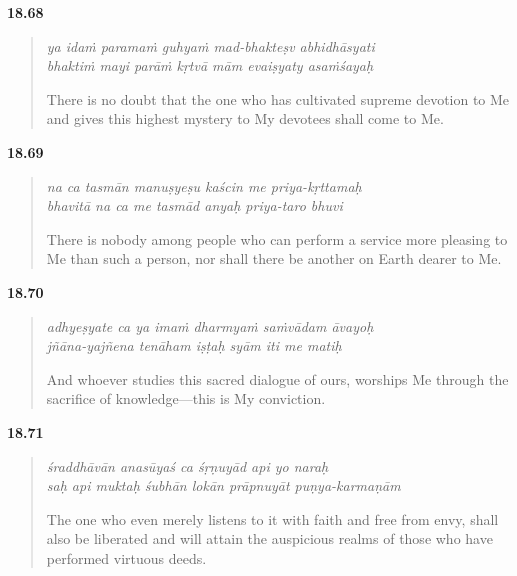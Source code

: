 \par\noindent\textbf{18.68}\par
\begin{verse}
\textit{ya idaṁ paramaṁ guhyaṁ mad-bhakteṣv abhidhāsyati} \\
\textit{bhaktiṁ mayi parāṁ kṛtvā mām evaiṣyaty asaṁśayaḥ}

\noindent There is no doubt that the one who has cultivated supreme devotion to Me and gives this highest mystery to My devotees shall come to Me.
\end{verse}
\par



\par\noindent\textbf{18.69}\par
\begin{verse}
\textit{na ca tasmān manuṣyeṣu kaścin me priya-kṛttamaḥ} \\
\textit{bhavitā na ca me tasmād anyaḥ priya-taro bhuvi}

\noindent There is nobody among people who can perform a service more pleasing to Me than such a person, nor shall there be another on Earth dearer to Me.
\end{verse}
\par



\par\noindent\textbf{18.70}\par
\begin{verse}
\textit{adhyeṣyate ca ya imaṁ dharmyaṁ saṁvādam āvayoḥ} \\
\textit{jñāna-yajñena tenāham iṣṭaḥ syām iti me matiḥ}

\noindent And whoever studies this sacred dialogue of ours, worships Me through the sacrifice of knowledge---this is My conviction.
\end{verse}
\par



\par\noindent\textbf{18.71}\par
\begin{verse}
\textit{śraddhāvān anasūyaś ca śṛṇuyād api yo naraḥ} \\
\textit{saḥ api muktaḥ śubhān lokān prāpnuyāt puṇya-karmaṇām}

\noindent The one who even merely listens to it with faith and free from envy, shall also be liberated and will attain the auspicious realms of those who have performed virtuous deeds.
\end{verse}
\par


